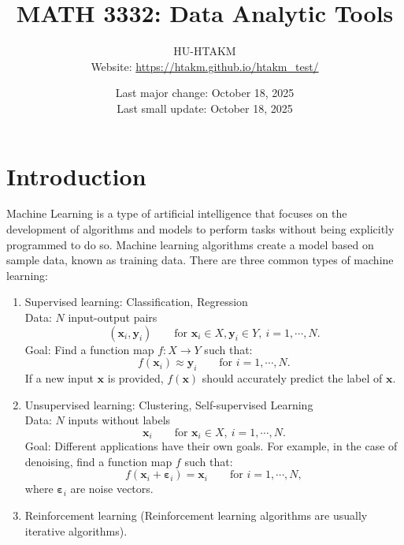 \documentclass{huhtakm-template-book-v2}
\title{
	\Huge MATH 3332: Data Analytic Tools
}
\author{
	HU-HTAKM\\
	\small Website: \url{https://htakm.github.io/htakm_test/}
}
\date{
	Last major change: October 18, 2025\\
	Last small update: October 18, 2025
}
\begin{document}
\maketitle
\tableofcontents

\chapter{Introduction}
    \label{Chapter 1: Introduction}
    Machine Learning is a type of artificial intelligence that focuses on the development of algorithms and models to perform tasks without being explicitly programmed to do so. Machine learning algorithms create a model based on sample data, known as training data. There are three common types of machine learning:
    \begin{enumerate}
        \item Supervised learning: Classification, Regression\\
        Data: $N$ input-output pairs
        \begin{equation*}
            (\mathbf{x}_{i}, \mathbf{y}_{i}) \qquad \text{for } \mathbf{x}_{i} \in X, \mathbf{y}_{i} \in Y, \ i = 1, \cdots, N.
        \end{equation*}
        Goal: Find a function map $f: X \to Y$ such that:
        \begin{equation*}
            f(\mathbf{x}_{i}) \approx \mathbf{y}_{i} \qquad \text{for } i = 1, \cdots, N.
        \end{equation*}
        If a new input $\mathbf{x}$ is provided, $f(\mathbf{x})$ should accurately predict the label of $\mathbf{x}$.
        \item Unsupervised learning: Clustering, Self-supervised Learning\\
        Data: $N$ inputs without labels
        \begin{equation*}
            \mathbf{x}_{i} \qquad \text{for } \mathbf{x}_{i} \in X, \ i = 1, \cdots, N.
        \end{equation*}
        Goal: Different applications have their own goals. For example, in the case of denoising, find a function map $f$ such that:
        \begin{equation*}
            f(\mathbf{x}_{i} + \boldsymbol{\varepsilon}_{i}) = \mathbf{x}_{i} \qquad \text{for } i = 1, \cdots, N,
        \end{equation*}
        where $\boldsymbol{\varepsilon}_{i}$ are noise vectors.
        \item Reinforcement learning (Reinforcement learning algorithms are usually iterative algorithms).
    \end{enumerate}
\end{document}
